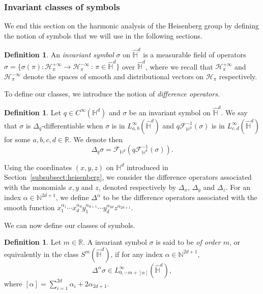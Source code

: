 \documentclass[12pt,a4paper]{amsart}
\theoremstyle{plain}
\theoremstyle{definition}
\newtheorem{definition}[theorem]{Definition}
\theoremstyle{remark}
\numberwithin{equation}{section}
\theoremstyle{definition}
\def\R{{\mathbb R}}%
\def\N{{\mathbb N}}%
\def \Heis{\mathbb{H}}
\def \Hhat{\widehat{\Heis}}
\def \cH{\mathcal{H}}
\def \cF{\mathcal{F}}
\numberwithin{equation}{section}
\begin{document}
\subsubsection{Invariant classes of symbols}

We end this section on the harmonic analysis of the Heisenberg group by defining the notion of symbols that we will use in the following sections.

\begin{definition}
    \label{def:invsym}
    An \emph{invariant symbol} $\sigma$ on $\Hhat^d$ is a measurable field of operators $\sigma = \{\sigma(\pi):\cH_{\pi}^{+\infty}\rightarrow \cH_{\pi}^{-\infty}\,:\,\pi\in\Hhat^d\}$ over $\Hhat^d$, where we recall that $\cH_{\pi}^{+\infty}$ and $\cH_{\pi}^{-\infty}$ denote the spaces of smooth and distributional vectors on $\cH_\pi$ respectively.
\end{definition}

To define our classes, we introduce the notion of \emph{difference operators}.

\begin{definition}
    \label{def:diffop}
    Let $q\in C^\infty(\Heis^d)$ and $\sigma$ be an invariant symbol on $\Hhat^d$. We say that $\sigma$ is $\Delta_q$-differentiable when $\sigma$ is in $L_{a,b}^\infty(\Hhat^d)$ and $q \cF_{\Heis^d}^{-1}(\sigma)$ is in $L_{c,d}^\infty(\Hhat^d)$ for some $a,b,c,d \in \R$. We denote then 
    \begin{equation*}
        \Delta_q \sigma = \cF_{\Heis^d} \left(q \cF_{\Heis^d}^{-1}(\sigma)\right).
    \end{equation*}
 \end{definition}

Using the coordinates $(x,y,z)$ on $\Heis^d$ introduced in Section~\ref{subsubsect:heisenberg}, we consider the difference operators associated with the monomials $x,y$ and $z$, denoted respectively by $\Delta_x$, $\Delta_y$ and $\Delta_z$. For an index $\alpha \in \N^{2d+1}$, we define $\Delta^\alpha$ to be the difference operators associated with the smooth function $x_{1}^{\alpha_1}\cdots x_{d}^{\alpha_d}y_{1}^{\alpha_{d+1}}\cdots y_{d}^{\alpha_{2d}}z^{\alpha_{2d+1}}$.

We can now define our classes of symbols.

\begin{definition}
    \label{def:invsymbol}
    Let $m\in\R$. A invariant symbol $\sigma$ is said to be \emph{of order $m$}, or equivalently in the class $S^m(\Hhat^d)$, if for any index $\alpha\in \N^{2d+1}$,
    \begin{equation*}
        \Delta^\alpha \sigma \in L_{0,-m+[\alpha]}^\infty(\Hhat^d),
    \end{equation*}
    where $[\alpha] = \sum_{i=1}^{2d}\alpha_i + 2\alpha_{2d+1}$.
\end{definition}
\end{document}

